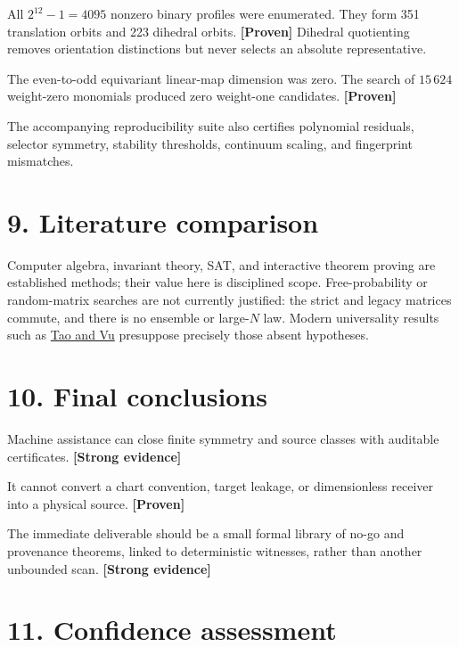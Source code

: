 \documentclass[11pt,a4paper,openany]{report}
\newcommand{\statusProven}{\textcolor{fingreen}{[Proven]}}
\newcommand{\statusStrong}{\textcolor{finblue}{[Strong evidence]}}
\begin{document}
All \(2^{12}-1=4095\) nonzero binary profiles were enumerated. They form 351 translation orbits and 223 dihedral orbits. \textbf{\statusProven{}} Dihedral quotienting removes orientation distinctions but never selects an absolute representative.

The even-to-odd equivariant linear-map dimension was zero. The search of \(15\,624\) weight-zero monomials produced zero weight-one candidates. \textbf{\statusProven{}}

The accompanying reproducibility suite also certifies polynomial residuals, selector symmetry, stability thresholds, continuum scaling, and fingerprint mismatches.

\section{9. Literature comparison}

Computer algebra, invariant theory, SAT, and interactive theorem proving are established methods; their value here is disciplined scope. Free-probability or random-matrix searches are not currently justified: the strict and legacy matrices commute, and there is no ensemble or large-\(N\) law. Modern universality results such as \href{https://arxiv.org/abs/1202.0068}{Tao and Vu} presuppose precisely those absent hypotheses.

\section{10. Final conclusions}

Machine assistance can close finite symmetry and source classes with auditable certificates. \textbf{\statusStrong{}}

It cannot convert a chart convention, target leakage, or dimensionless receiver into a physical source. \textbf{\statusProven{}}

The immediate deliverable should be a small formal library of no-go and provenance theorems, linked to deterministic witnesses, rather than another unbounded scan. \textbf{\statusStrong{}}

\section{11. Confidence assessment}
\end{document}
